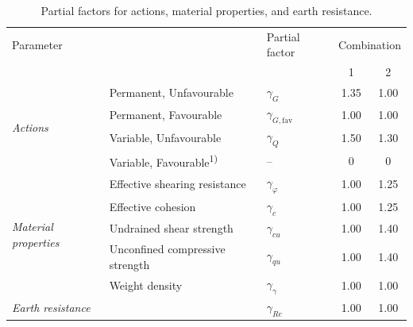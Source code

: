 \begin{table}[H]
\centering
\small
\setlength{\tabcolsep}{8pt}
\renewcommand{\arraystretch}{1.2}
\begin{tabular}{@{}l l l c c@{}}
\toprule
\multicolumn{1}{l}{Parameter} & 
\multicolumn{1}{l}{ } & 
\multicolumn{1}{l}{Partial factor} & 
\multicolumn{2}{c}{Combination}\\
\cmidrule(lr){4-5}
 & & & 1 & 2 \\
\midrule
\multirow{4}{*}{\textit{Actions}} 
 & Permanent, Unfavourable & $\gamma_G$ & 1.35 & 1.00 \\
 & Permanent, Favourable   & $\gamma_{G,\mathrm{fav}}$ & 1.00 & 1.00 \\
 & Variable, Unfavourable  & $\gamma_Q$ & 1.50 & 1.30 \\
 & Variable, Favourable\textsuperscript{1)} & -- & 0 & 0 \\
\midrule
\multirow{5}{*}{\textit{Material properties}} 
 & Effective shearing resistance & $\gamma_\varphi$ & 1.00 & 1.25 \\
 & Effective cohesion & $\gamma_c$ & 1.00 & 1.25 \\
 & Undrained shear strength & $\gamma_{cu}$ & 1.00 & 1.40 \\
 & Unconfined compressive strength & $\gamma_{qu}$ & 1.00 & 1.40 \\
 & Weight density & $\gamma_\gamma$ & 1.00 & 1.00 \\
\midrule
\textit{Earth resistance} & & $\gamma_{Re}$ & 1.00 & 1.00 \\
\bottomrule
\end{tabular}
\caption{Partial factors for actions, material properties, and earth resistance.}
\label{tab:partial_factors}
\end{table}



